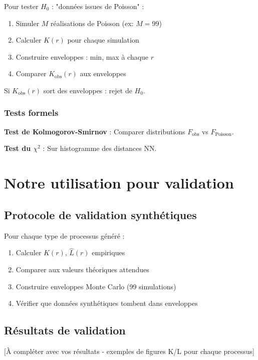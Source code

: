 Pour tester $H_0$ : "données issues de Poisson" :
\begin{enumerate}
    \item Simuler $M$ réalisations de Poisson (ex: $M=99$)
    \item Calculer $K(r)$ pour chaque simulation
    \item Construire enveloppes : min, max à chaque $r$
    \item Comparer $K_{\text{obs}}(r)$ aux enveloppes
\end{enumerate}

Si $K_{\text{obs}}(r)$ sort des enveloppes : rejet de $H_0$.

\subsubsection{Tests formels}

\textbf{Test de Kolmogorov-Smirnov} : Comparer distributions $F_{\text{obs}}$ vs $F_{\text{Poisson}}$.

\textbf{Test du $\chi^2$} : Sur histogramme des distances NN.

\section{Notre utilisation pour validation}

\subsection{Protocole de validation synthétiques}

Pour chaque type de processus généré :
\begin{enumerate}
    \item Calculer $\hat{K}(r)$, $\hat{L}(r)$ empiriques
    \item Comparer aux valeurs théoriques attendues
    \item Construire enveloppes Monte Carlo (99 simulations)
    \item Vérifier que données synthétiques tombent dans enveloppes
\end{enumerate}

\subsection{Résultats de validation}

[À compléter avec vos résultats - exemples de figures K/L pour chaque processus]

